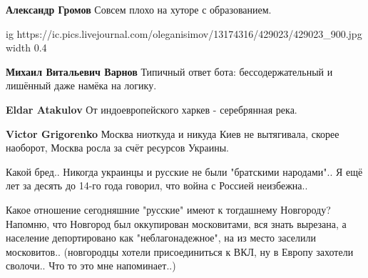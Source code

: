 \begin{itemize}
\begin{itemize}
 
\textbf{Александр Громов} Совсем плохо на хуторе с образованием.

\ifcmt
  ig https://ic.pics.livejournal.com/oleganisimov/13174316/429023/429023_900.jpg
  width 0.4
\fi

 
\textbf{Михаил Витальевич Варнов} Типичный ответ бота: бессодержательный и лишённый даже намёка на логику.

 
\textbf{Eldar Atakulov} От индоевропейского харкев - серебрянная река.

 
\textbf{Victor Grigorenko} Москва ниоткуда и никуда Киев не вытягивала, скорее наоборот, Москва росла за счёт ресурсов Украины.

 
Какой бред.. Никогда украинцы и русские не были "братскими народами".. Я ещё
лет за десять до 14-го года говорил, что война с Россией неизбежна..

 

Какое отношение сегодняшние "русские" имеют к тогдашнему Новгороду? Напомню,
что Новгород был оккупирован московитами, вся знать вырезана, а население
депортировано как "неблагонадежное", на из место заселили московитов..
(новгородцы хотели присоединиться к ВКЛ, ну в Европу захотели сволочи.. Что то
это мне напоминает..)



\end{itemize}
\end{itemize}
